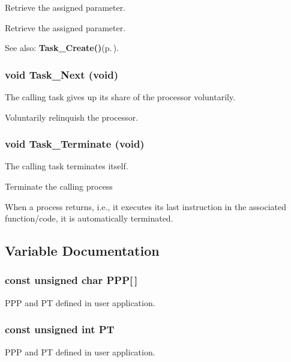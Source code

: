 Retrieve the assigned parameter. 

Retrieve the assigned parameter. \begin{Desc}
\item[See also:]{\bf Task\_\-Create()}{\rm (p.\,\pageref{os_8c_d26f7e7c3185a703e89e97547747b03e})}. \end{Desc}
\subsubsection{\setlength{\rightskip}{0pt plus 5cm}void Task\_\-Next (void)}\label{os_8h_df2f899160bcb12d32f2cbce83470ea5}


The calling task gives up its share of the processor voluntarily. 

Voluntarily relinquish the processor. 
\subsubsection{\setlength{\rightskip}{0pt plus 5cm}void Task\_\-Terminate (void)}\label{os_8h_eb1fcf3f13ebc649c9882f07de88cf74}


The calling task terminates itself. 

Terminate the calling process

When a process returns, i.e., it executes its last instruction in the associated function/code, it is automatically terminated. 

\subsection{Variable Documentation}
\subsubsection{\setlength{\rightskip}{0pt plus 5cm}const unsigned char {\bf PPP}[$\,$]}\label{os_8h_9139cb65cf60e47afed151765972c100}


PPP and PT defined in user application. 
\subsubsection{\setlength{\rightskip}{0pt plus 5cm}const unsigned int {\bf PT}}\label{os_8h_6370d00b2f49ebb4a69edf643003ada2}


PPP and PT defined in user application. 